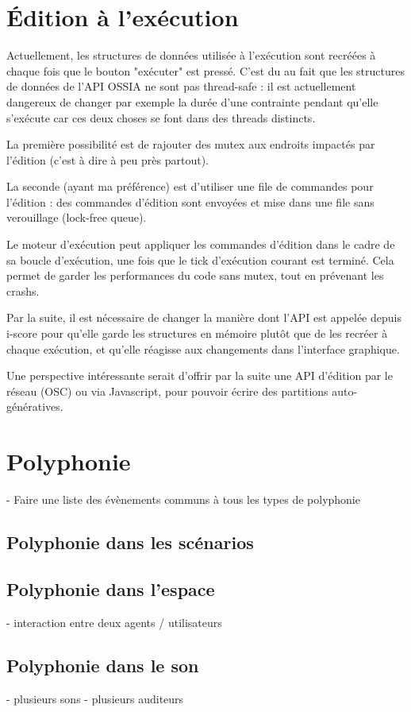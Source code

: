 \documentclass[french,a4paper]{book}
\begin{document}
\section{Édition à l'exécution}
Actuellement, les structures de données utilisée à l'exécution sont recréées à chaque fois que le bouton "exécuter" est pressé.
C'est du au fait que les structures de données de l'API OSSIA ne sont pas thread-safe : il est actuellement dangereux de changer par exemple 
la durée d'une contrainte pendant qu'elle s'exécute car ces deux choses se font dans des threads distincts.

La première possibilité est de rajouter des mutex aux endroits impactés par l'édition 
(c'est à dire à peu près partout).

La seconde (ayant ma préférence) est d'utiliser une file de commandes pour l'édition : 
des commandes d'édition sont envoyées et mise dans une file sans verouillage (lock-free queue).

Le moteur d'exécution peut appliquer les commandes d'édition dans le cadre de sa boucle d'exécution, 
une fois que le tick d'exécution courant est terminé.
Cela permet de garder les performances du code sans mutex, tout en prévenant les crashs.

Par la suite, il est nécessaire de changer la manière dont l'API est appelée depuis i-score
pour qu'elle garde les structures en mémoire plutôt que de les recréer à chaque exécution, 
et qu'elle réagisse aux changements dans l'interface graphique.

Une perspective intéressante serait d'offrir par la suite une API d'édition par le réseau (OSC) 
ou via Javascript, pour pouvoir écrire des partitions auto-génératives.

\section{Polyphonie}
- Faire une liste des évènements communs à tous les types de polyphonie
\subsection{Polyphonie dans les scénarios}
\subsection{Polyphonie dans l'espace}
- interaction entre deux agents / utilisateurs

\subsection{Polyphonie dans le son}
- plusieurs sons
- plusieurs auditeurs
\end{document}
